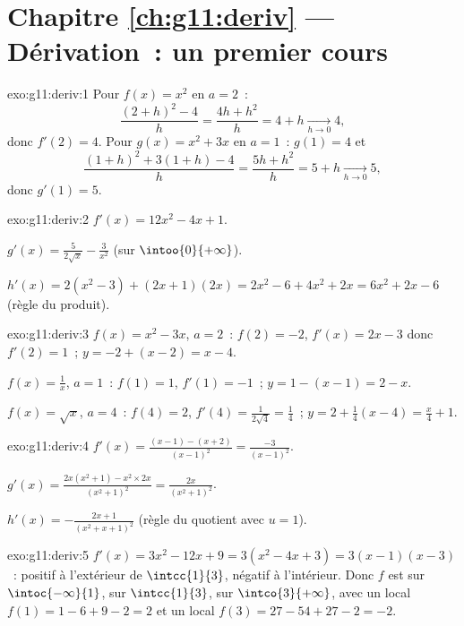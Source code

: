 \section*{Chapitre \ref{ch:g11:deriv} --- Dérivation~: un premier cours}

\begin{solution}{exo:g11:deriv:1}
Pour $f(x) = x^2$ en $a = 2$~:
\[
\frac{(2+h)^2 - 4}{h} = \frac{4h + h^2}{h} = 4 + h
\xrightarrow[h\to0]{} 4,
\]
donc $f'(2) = 4$. Pour $g(x) = x^2 + 3x$ en $a = 1$~: $g(1) = 4$ et
\[
\frac{(1+h)^2 + 3(1+h) - 4}{h} = \frac{5h + h^2}{h} = 5 + h
\xrightarrow[h\to0]{} 5,
\]
donc $g'(1) = 5$.
\end{solution}

\begin{solution}{exo:g11:deriv:2}
$f'(x) = 12x^2 - 4x + 1$.

$g'(x) = \frac{5}{2\sqrt x} - \frac{3}{x^2}$ (sur $\intoo{0}{+\infty}$).

$h'(x) = 2(x^2 - 3) + (2x+1)(2x) = 2x^2 - 6 + 4x^2 + 2x
= 6x^2 + 2x - 6$ (règle du produit).
\end{solution}

\begin{solution}{exo:g11:deriv:3}
$f(x) = x^2 - 3x$, $a = 2$~: $f(2) = -2$, $f'(x) = 2x - 3$ donc
$f'(2) = 1$~;  $y = -2 + (x - 2) = x - 4$.

$f(x) = \frac1x$, $a = 1$~: $f(1) = 1$, $f'(1) = -1$~; 
$y = 1 - (x - 1) = 2 - x$.

$f(x) = \sqrt x$, $a = 4$~: $f(4) = 2$, $f'(4) = \frac{1}{2\sqrt4} =
\frac14$~;  $y = 2 + \frac14(x - 4) = \frac{x}{4} + 1$.
\end{solution}

\begin{solution}{exo:g11:deriv:4}
$f'(x) = \frac{(x-1) - (x+2)}{(x-1)^2} = \frac{-3}{(x-1)^2}$.

$g'(x) = \frac{2x(x^2+1) - x^2 \times 2x}{(x^2+1)^2}
= \frac{2x}{(x^2+1)^2}$.

$h'(x) = -\frac{2x+1}{(x^2+x+1)^2}$ (règle du quotient avec $u = 1$).
\end{solution}

\begin{solution}{exo:g11:deriv:5}
$f'(x) = 3x^2 - 12x + 9 = 3(x^2 - 4x + 3) = 3(x-1)(x-3)$~: positif à
l'extérieur de $\intcc{1}{3}$, négatif à l'intérieur. Donc $f$ est
 sur $\intoc{-\infty}{1}$,  sur $\intcc{1}{3}$,
 sur $\intco{3}{+\infty}$, avec un  local
$f(1) = 1 - 6 + 9 - 2 = 2$ et un  local
$f(3) = 27 - 54 + 27 - 2 = -2$.
\end{solution}

